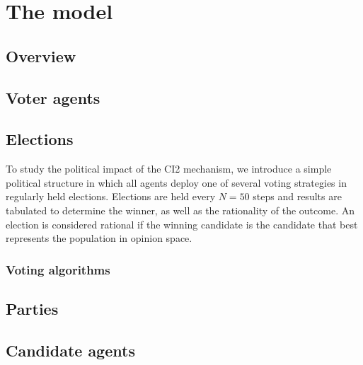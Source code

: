 \section{The model}
\label{sec:model}

\subsection{Overview}


\subsection{Voter agents}


\subsection{Elections}


To study the political impact of the CI2 mechanism, we introduce a simple political
structure in which all agents deploy one of several voting strategies in regularly held elections.
Elections are held every $N=50$ steps and results are tabulated to determine the winner, as well 
as the rationality of the outcome. An election is considered rational if the
winning candidate is the candidate that best represents the population
in opinion space.

\subsubsection{Voting algorithms}




\subsection{Parties}


\subsection{Candidate agents}


